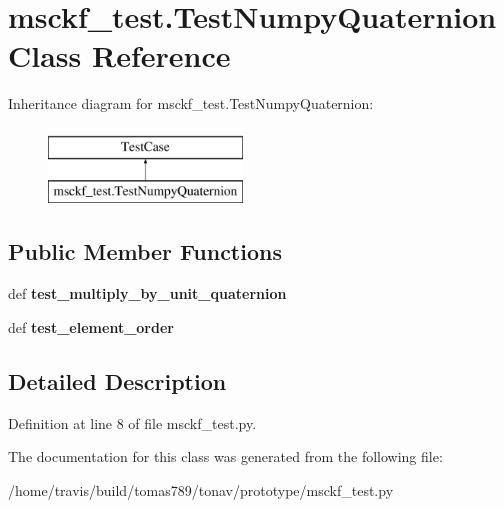 \hypertarget{classmsckf__test_1_1_test_numpy_quaternion}{\section{msckf\-\_\-test.\-Test\-Numpy\-Quaternion Class Reference}
\label{classmsckf__test_1_1_test_numpy_quaternion}
}
Inheritance diagram for msckf\-\_\-test.\-Test\-Numpy\-Quaternion\-:\begin{figure}[H]
\begin{center}
\leavevmode
\includegraphics[height=2.000000cm]{classmsckf__test_1_1_test_numpy_quaternion}
\end{center}
\end{figure}
\subsection*{Public Member Functions}
\begin{DoxyCompactItemize}
\item 
\hypertarget{classmsckf__test_1_1_test_numpy_quaternion_ac120e1e04eb3df181bbe9c6b3ebac999}{def {\bfseries test\-\_\-multiply\-\_\-by\-\_\-unit\-\_\-quaternion}}\label{classmsckf__test_1_1_test_numpy_quaternion_ac120e1e04eb3df181bbe9c6b3ebac999}

\item 
\hypertarget{classmsckf__test_1_1_test_numpy_quaternion_a48568c2d3071f0c3aa8db91ae2fefdc8}{def {\bfseries test\-\_\-element\-\_\-order}}\label{classmsckf__test_1_1_test_numpy_quaternion_a48568c2d3071f0c3aa8db91ae2fefdc8}

\end{DoxyCompactItemize}


\subsection{Detailed Description}


Definition at line 8 of file msckf\-\_\-test.\-py.



The documentation for this class was generated from the following file\-:\begin{DoxyCompactItemize}
\item 
/home/travis/build/tomas789/tonav/prototype/msckf\-\_\-test.\-py\end{DoxyCompactItemize}
